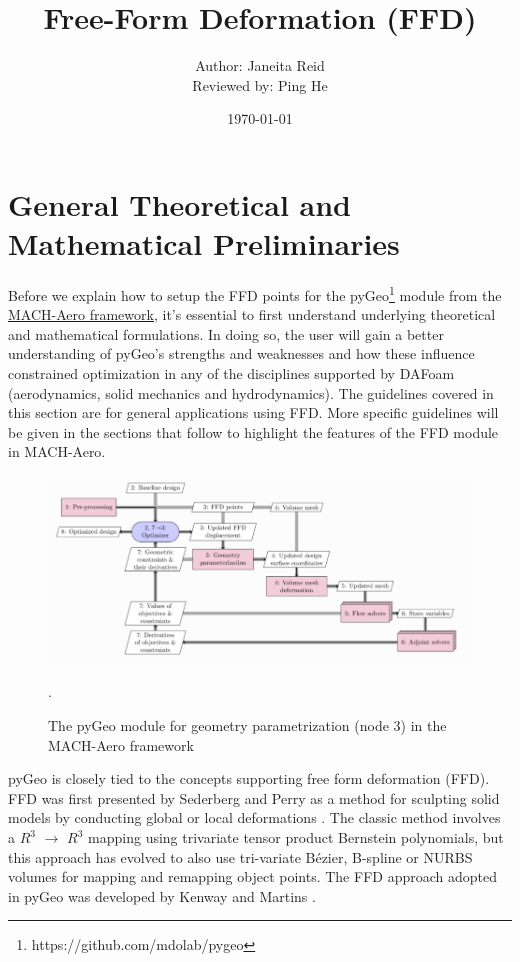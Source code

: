 \documentclass[12pt]{article}
\author{
Author: Janeita Reid\\
\linebreak
Reviewed by: Ping He\\
}
\date{\today}
\begin{document}
\title{Free-Form Deformation (FFD)}

  
\maketitle
  
\tableofcontents


\section{General Theoretical and Mathematical Preliminaries}

Before we explain how to setup the FFD points for the pyGeo\footnote{https://github.com/mdolab/pygeo} module from the \href{https://github.com/mdolab/MACH-Aero}{MACH-Aero framework}, it's essential to first understand underlying theoretical and mathematical formulations. In doing so, the user will gain a better understanding of pyGeo's strengths and weaknesses and how these influence constrained optimization in any of the disciplines supported by DAFoam (aerodynamics, solid mechanics and hydrodynamics). The guidelines covered in this section are for general applications using FFD. More specific guidelines  will be given in the sections that follow to highlight the features of the FFD module in MACH-Aero.\vspace{4mm} 

\begin{figure}[ht]
    \centering
    \includegraphics[width=1\textwidth]{pygeo.PNG}
    \caption{The pyGeo module for geometry parametrization (node 3) in the MACH-Aero framework \cite{machaero}}.
    \label{fig:my_label}
\end{figure}

\noindent pyGeo is closely tied to the concepts supporting free form deformation (FFD). FFD was first presented by Sederberg and Perry as a method for sculpting solid models by conducting global or local deformations \cite{sederberg}. The classic method involves a $R^3$ $\rightarrow$ $R^3$ mapping using trivariate tensor product Bernstein polynomials\cite{sederberg}, but this approach has evolved to also use  tri-variate Bézier, B-spline or NURBS volumes \cite{kenway} for mapping and remapping object points. The FFD approach adopted in pyGeo was developed by Kenway and Martins \cite{kenway}.\vspace{4mm} 
\end{document}
